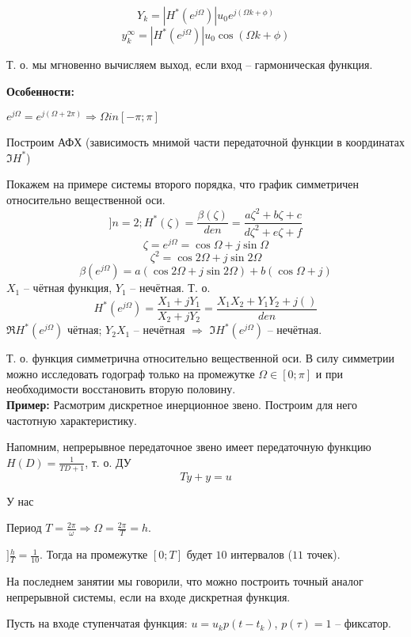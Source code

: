 \documentclass[main.tex]{subfiles}
\begin{document}
\[ \boxed{ Y_k = | H^*(e^{j \Omega}) | u_0 e^{j (\Omega k + \phi)} } \]
\[ y_k^\infty = | H^*(e^{j \Omega}) | u_0 \cos(\Omega k + \phi) \]

Т. о. мы мгновенно вычисляем выход, если вход -- гармоническая функция.

\textbf{ Особенности: }

$ e^{j \Omega} = e^{j (\Omega + 2 \pi)} \Rightarrow \Omega in [- \pi; \pi] $ %

Построим АФХ (зависимость мнимой части передаточной функции в координатах $ \Im H^* $) %

Покажем на примере системы второго порядка, что график симметричен относительно вещественной оси.
\[ ] n = 2; H^*(\zeta) = \frac{\beta(\zeta)}{den} = \frac{ a \zeta^2 + b \zeta + c }{ d \zeta^2 + e \zeta + f } \]
\[ \zeta = e^{j \Omega} = \cos \Omega + j \sin \Omega \]
\[ \zeta^2 = \cos 2 \Omega + j \sin 2 \Omega \]
\[ \beta(e^{j \Omega}) = a(\cos 2 \Omega + j \sin 2 \Omega) + b (\cos \Omega + j ) \] %
$ X_1 $ -- чётная функция, $ Y_1 $ -- нечётная.
Т. о.
\[ H^*(e^{j \Omega}) = \frac{ X_1 + j Y_1 }{ X_2 + j Y_2 } = \frac{ X_1 X_2 + Y_1 Y_2 + j () }{den} \] %
$ \Re H^* (e^{j \Omega}) $ чётная; $ Y_2 X_1 $ -- нечётная $ \Rightarrow $  $ \Im H^*(e^{j \Omega}) $ -- нечётная.


Т. о. функция симметрична относительно вещественной оси.
В силу симметрии можно исследовать годограф только на промежутке $ \Omega \in [ 0; \pi ] $ и при необходимости восстановить вторую половину. \\

\textbf{ Пример: }
Расмотрим дискретное инерционное звено.
Построим для него частотную характеристику.

Напомним, непрерывное передаточное звено имеет передаточную функцию $ H(D) = \frac{1}{T D + 1} $, т. о. ДУ
\[ T \dot y + y = u \]

У нас 

Период $ T = \frac{2 \pi}{\omega} \Rightarrow \Omega = \frac{2 \pi}{T} = h $.

$ ] \frac{h}{T} = \frac{1}{10} $.
Тогда на промежутке $ [0;T] $ будет $ 10 $ интервалов ($ 11 $ точек).


На последнем занятии мы говорили, что можно построить точный аналог непрерывной системы, если на входе дискретная функция.

Пусть на входе ступенчатая функция: $ u = u_k p( t - t_k ) $, $ p(\tau) = 1 $ -- фиксатор.
\end{document}
